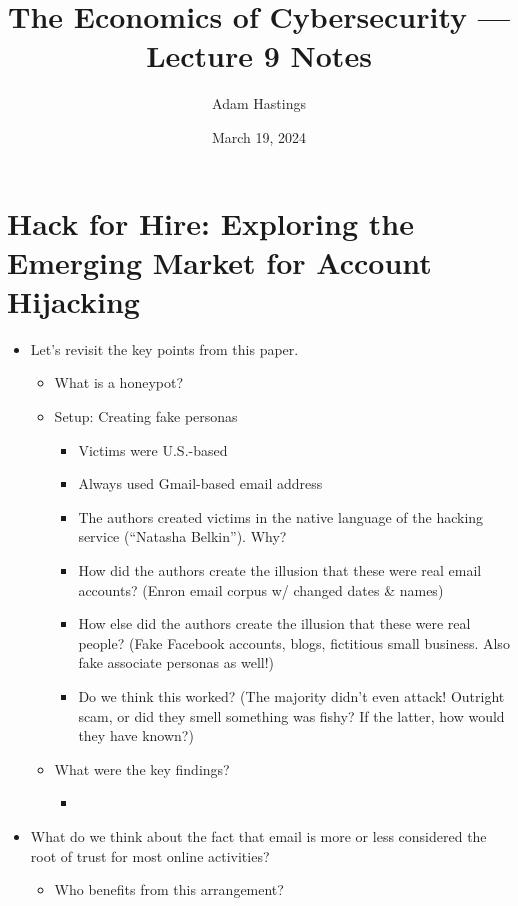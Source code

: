 \documentclass[11pt]{article}
\title{The Economics of Cybersecurity --- Lecture 9 Notes}
\date{March 19, 2024}
\author{Adam Hastings}
\begin{document}
\maketitle



\section{Hack for Hire: Exploring the Emerging Market for Account Hijacking}


\begin{itemize}
    \item Let's revisit the key points from this paper. 
    \begin{itemize}
        \item What is a honeypot?
        \item Setup: Creating fake personas
        \begin{itemize}
            \item Victims were U.S.-based
            \item Always used Gmail-based email address 
            \item The authors created victims in the native language of the hacking service (``Natasha Belkin''). Why?
            \item How did the authors create the illusion that these were real email accounts? (Enron email corpus w/ changed dates \& names)
            \item How else did the authors create the illusion that these were real people? (Fake Facebook accounts, blogs, fictitious small business. Also fake associate personas as well!)
            \item Do we think this worked? (The majority didn't even attack! Outright scam, or did they smell something was fishy? If the latter, how would they have known?)
        \end{itemize}
        \item What were the key findings?
        \begin{itemize}
            \item 
        \end{itemize}
    \end{itemize}
    \item What do we think about the fact that email is more or less considered the root of trust for most online activities?
    \begin{itemize}
        \item Who benefits from this arrangement?

\end{itemize}
\end{itemize}
\end{document}
